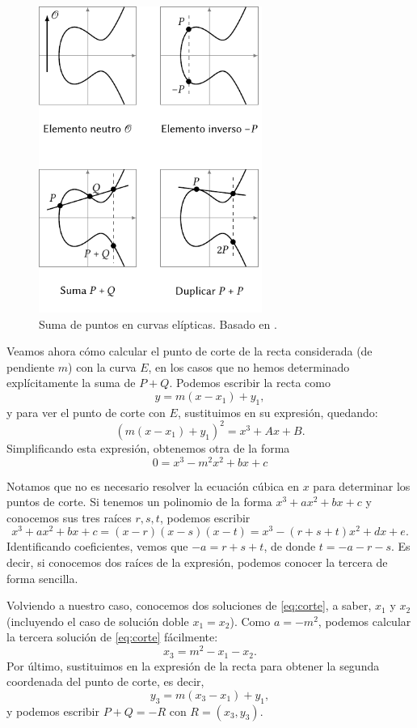 \documentclass[
  a4paper,
  12pt,
  spanish,
]{scrartcl}
\begin{document}
\begin{figure}[h]
  \centering
  \includegraphics[width=0.65\textwidth]{img/operaciones-curvas}
  \caption{Suma de puntos en curvas elípticas. Basado en  \parencite{eichlseder_elliptic_2016}.}
  \label{fig:operaciones-curvas}
\end{figure}

Veamos ahora cómo calcular el punto de corte de la recta considerada (de pendiente $m$) con la curva $E$, en los casos que no hemos determinado explícitamente la suma de $P+Q$. Podemos escribir la recta como \[ y = m(x - x_1) + y_1, \] y para ver el punto de corte con $E$, sustituimos en su expresión, quedando: \[ (m(x - x_1) + y_1)^2 = x^3 + Ax + B. \] Simplificando esta expresión, obtenemos otra de la forma
\begin{equation}
    \label{eq:corte}
	0 = x^3 - m^2x^2 + bx + c 
\end{equation} 

    Notamos que no es necesario resolver la ecuación cúbica en $x$ para determinar los puntos de corte. Si tenemos un polinomio de la forma $x^3 + ax^2 + bx + c$ y conocemos sus tres raíces $r,s,t$, podemos escribir \[ x^3 + ax^2 + bx + c = (x-r)(x-s)(x-t) = x^3 - (r+s+t)x^2 + dx + e. \] Identificando coeficientes, vemos que $-a = r + s + t$, de donde $t = -a -r -s$. Es decir, si conocemos dos raíces de la expresión, podemos conocer la tercera de forma sencilla.
    
    Volviendo a nuestro caso, conocemos dos soluciones de \eqref{eq:corte}, a saber, $x_1$ y $x_2$ (incluyendo el caso de solución doble $x_1=x_2$). Como $a = -m^2$, podemos calcular la tercera solución de \eqref{eq:corte} fácilmente: \[ x_3 = m^2 - x_1 - x_2. \] Por último, sustituimos en la expresión de la recta para obtener la segunda coordenada del punto de corte, es decir, \[y_3 = m(x_3 - x_1) + y_1, \] y podemos escribir $P+Q = -R$ con $R=(x_3, y_3)$.
    
\end{document}
